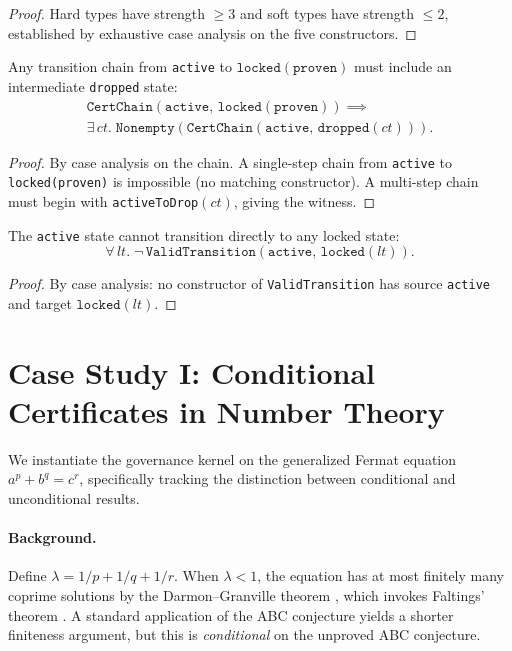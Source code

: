 \documentclass[runningheads]{llncs}
\begin{document}
\begin{proof}
Hard types have strength $\geq 3$ and soft types have strength $\leq 2$,
established by exhaustive case analysis on the five constructors.
\end{proof}

\begin{theorem}
\label{thm:evidence}
Any transition chain from \texttt{active} to $\texttt{locked}(\texttt{proven})$
must include an intermediate \texttt{dropped} state:
\begin{multline*}
\texttt{CertChain}(\texttt{active},\, \texttt{locked}(\texttt{proven})) \implies \\
  \exists\, ct.\; \texttt{Nonempty}(\texttt{CertChain}(\texttt{active},\, \texttt{dropped}(ct))).
\end{multline*}
\end{theorem}

\begin{proof}
By case analysis on the chain. A single-step chain from
\texttt{active} to \texttt{locked\allowbreak(proven)} is impossible
(no matching constructor). A multi-step chain must begin
with \texttt{activeToDrop}$(ct)$, giving the witness.
\end{proof}

\begin{theorem}
\label{thm:noskip}
The \texttt{active} state cannot transition directly to any locked state:
$$\forall\, lt.\; \neg\, \texttt{ValidTransition}(\texttt{active},\, \texttt{locked}(lt)).$$
\end{theorem}

\begin{proof}
By case analysis: no constructor of \texttt{ValidTransition} has source
\texttt{active} and target $\texttt{locked}(lt)$.
\end{proof}

\section{Case Study I: Conditional Certificates in Number Theory}
\label{sec:case1}

We instantiate the governance kernel on the generalized Fermat equation
$a^p + b^q = c^r$, specifically tracking the distinction between conditional
and unconditional results.

\paragraph{Background.}
Define $\lambda = 1/p + 1/q + 1/r$. When $\lambda < 1$, the equation has at
most finitely many coprime solutions by the Darmon--Granville theorem
\cite{DarmonGranville1995}, which invokes Faltings' theorem
\cite{Faltings1983}. A standard application of the ABC conjecture
\cite{Masser1985,Oesterle1988} yields a shorter finiteness argument, but this
is \emph{conditional} on the unproved ABC conjecture.
\end{document}
